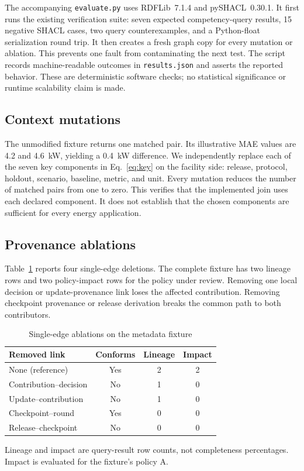 \documentclass[conference]{IEEEtran}
\newcommand{\term}[1]{\texttt{#1}}
\begin{document}
The accompanying \term{evaluate.py} uses RDFLib~7.1.4 and pySHACL~0.30.1. It first runs the existing verification suite: seven expected competency-query results, 15 negative SHACL cases, two query counterexamples, and a Python-float serialization round trip. It then creates a fresh graph copy for every mutation or ablation. This prevents one fault from contaminating the next test. The script records machine-readable outcomes in \term{results.json} and asserts the reported behavior. These are deterministic software checks; no statistical significance or runtime scalability claim is made.

\subsection{Context mutations}
The unmodified fixture returns one matched pair. Its illustrative MAE values are 4.2 and 4.6~kW, yielding a 0.4~kW difference. We independently replace each of the seven key components in Eq.~\eqref{eq:key} on the facility side: release, protocol, holdout, scenario, baseline, metric, and unit. Every mutation reduces the number of matched pairs from one to zero. This verifies that the implemented join uses each declared component. It does not establish that the chosen components are sufficient for every energy application.

\subsection{Provenance ablations}
Table~\ref{tab:ablations} reports four single-edge deletions. The complete fixture has two lineage rows and two policy-impact rows for the policy under review. Removing one local decision or update-provenance link loses the affected contribution. Removing checkpoint provenance or release derivation breaks the common path to both contributors.

\begin{table}[t]
\caption{Single-edge ablations on the metadata fixture}
\label{tab:ablations}
\centering\small
\begin{tabular}{@{}p{}ccc@{}}
\toprule
Removed link & Conforms & Lineage & Impact \\
\midrule
None (reference) & Yes & 2 & 2 \\
Contribution--decision & No & 1 & 0 \\
Update--contribution & No & 1 & 0 \\
Checkpoint--round & Yes & 0 & 0 \\
Release--checkpoint & No & 0 & 0 \\
\bottomrule
\end{tabular}
\vspace{2pt}
\parbox{\columnwidth}{\footnotesize Lineage and impact are query-result row counts, not completeness percentages. Impact is evaluated for the fixture's policy A.}
\end{table}
\end{document}
